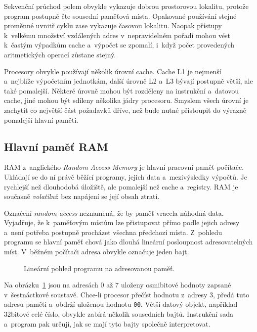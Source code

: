 Sekvenční průchod polem obvykle vykazuje dobrou prostorovou lokalitu, protože program postupně čte sousední paměťová místa. Opakované používání stejné proměnné uvnitř cyklu zase vykazuje časovou lokalitu. Naopak přístupy k~velkému množství vzdálených adres v~nepravidelném pořadí mohou vést k~častým výpadkům cache a~výpočet se zpomalí, i~když počet provedených aritmetických operací zůstane stejný.

Procesory obvykle používají několik úrovní cache. Cache L1 je nejmenší a~nejblíže výpočetním jednotkám, další úrovně L2 a~L3 bývají postupně větší, ale také pomalejší. Některé úrovně mohou být rozděleny na instrukční a~datovou cache, jiné mohou být sdíleny několika jádry procesoru. Smyslem všech úrovní je zachytit co největší část požadavků dříve, než bude nutné přistoupit do výrazně pomalejší hlavní paměti.


\subsection{Hlavní paměť RAM}\label{subsec:hw-ram}

RAM z~anglického \emph{Random Access Memory} je hlavní pracovní paměť počítače. Ukládají se do ní právě běžící programy, jejich data a~mezivýsledky výpočtů. Je rychlejší než dlouhodobá úložiště, ale pomalejší než cache a~registry. RAM je současně \emph{volatilní}: bez napájení se její obsah ztratí.

Označení \emph{random access} neznamená, že by paměť vracela náhodná data. Vyjadřuje, že k~paměťovým místům lze přistupovat přímo podle jejich adresy a~není potřeba postupně procházet všechna předchozí místa. Z~pohledu programu se hlavní paměť chová jako dlouhá lineární posloupnost adresovatelných míst. V~běžném počítači adresa obvykle označuje jeden bajt.

\begin{figure}[ht]
    \centering
    
    \caption{Lineární pohled programu na adresovanou paměť.}
    \label{fig:hw-ram-linearni}
\end{figure}

Na obrázku~\ref{fig:hw-ram-linearni} jsou na adresách $0$ až $7$ uloženy osmibitové hodnoty zapsané v~šestnáctkové soustavě. Chce-li procesor přečíst hodnotu z~adresy $3$, předá tuto adresu paměti a~obdrží uloženou hodnotu \texttt{00}. Větší datový objekt, například 32bitové celé číslo, obvykle zabírá několik sousedních bajtů. Instrukční sada a~program pak určují, jak se mají tyto bajty společně interpretovat.

